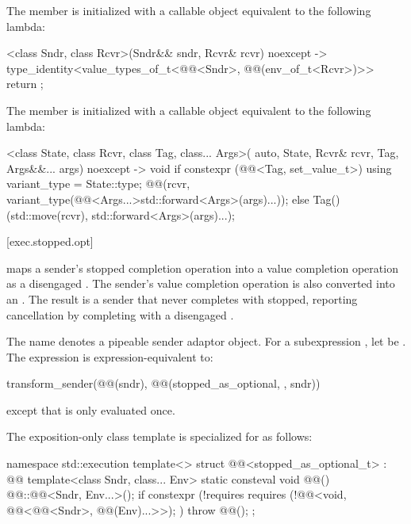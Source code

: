 \pnum
The member 
is initialized with a callable object equivalent to the following lambda:
\begin{codeblock}
[]<class Sndr, class Rcvr>(Sndr&& sndr, Rcvr& rcvr) noexcept
  -> type_identity<value_types_of_t<@@<Sndr>, @@(env_of_t<Rcvr>)>> {
  return {};
}
\end{codeblock}

\pnum
The member 
is initialized with a callable object equivalent to the following lambda:
\begin{codeblock}
[]<class State, class Rcvr, class Tag, class... Args>(
    auto, State, Rcvr& rcvr, Tag, Args&&... args) noexcept -> void {
  if constexpr (@@<Tag, set_value_t>) {
    using variant_type = State::type;
    @@(rcvr, variant_type(@@<Args...>{std::forward<Args>(args)...}));
  } else {
    Tag()(std::move(rcvr), std::forward<Args>(args)...);
  }
}
\end{codeblock}

[exec.stopped.opt]{}

\pnum
{} maps a sender's stopped completion operation
into a value completion operation as a disengaged .
The sender's value completion operation
is also converted into an .
The result is a sender that never completes with stopped,
reporting cancellation by completing with a disengaged .

\pnum
The name  denotes a pipeable sender adaptor object.
For a subexpression , let  be .
The expression  is expression-equivalent to:
\begin{codeblock}
transform_sender(@@(sndr), @@(stopped_as_optional, {}, sndr))
\end{codeblock}
except that  is only evaluated once.

\pnum
The exposition-only class template 
is specialized for  as follows:
\begin{codeblock}
namespace std::execution {
  template<>
  struct @@<stopped_as_optional_t> : @@ {
    template<class Sndr, class... Env>
      static consteval void @@() {
        @@::@@<Sndr, Env...>();
        if constexpr (!requires {
          requires (!@@<void, @@<@@<Sndr>,
                                                            @@(Env)...>>); })
          throw @@();
      }
  };
}
\end{codeblock}

